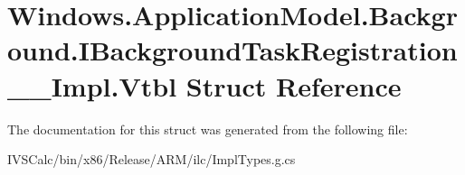 \hypertarget{struct_windows_1_1_application_model_1_1_background_1_1_i_background_task_registration_____impl_1_1_vtbl}{}\section{Windows.\+Application\+Model.\+Background.\+I\+Background\+Task\+Registration\+\_\+\+\_\+\+Impl.\+Vtbl Struct Reference}
\label{struct_windows_1_1_application_model_1_1_background_1_1_i_background_task_registration_____impl_1_1_vtbl}


The documentation for this struct was generated from the following file\+:\begin{DoxyCompactItemize}
\item 
I\+V\+S\+Calc/bin/x86/\+Release/\+A\+R\+M/ilc/Impl\+Types.\+g.\+cs\end{DoxyCompactItemize}
